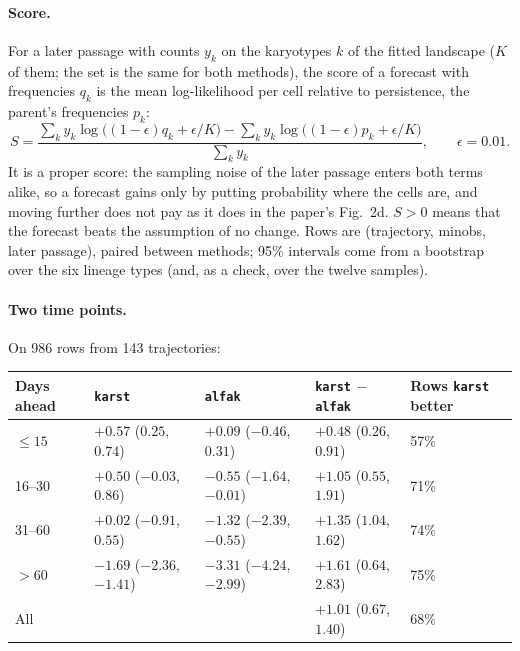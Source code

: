 \documentclass[11pt]{article}
\begin{document}
\paragraph{Score.} For a later passage with counts $y_k$ on the karyotypes $k$
of the fitted landscape ($K$ of them; the set is the same for both methods),
the score of a forecast with frequencies $q_k$ is the mean log-likelihood per
cell relative to persistence, the parent's frequencies $p_k$:
\begin{equation}
  S=\frac{\sum_k y_k\log\bigl((1-\epsilon)q_k+\epsilon/K\bigr)
         -\sum_k y_k\log\bigl((1-\epsilon)p_k+\epsilon/K\bigr)}{\sum_k y_k},
  \qquad \epsilon=0.01.
  \label{eq:horizon-score}
\end{equation}
It is a proper score: the sampling noise of the later passage enters both
terms alike, so a forecast gains only by putting probability where the cells
are, and moving further does not pay as it does in the paper's Fig.~2d.
$S>0$ means that the forecast beats the assumption of no change. Rows are
(trajectory, minobs, later passage), paired between methods; 95\% intervals
come from a bootstrap over the six lineage types (and, as a check, over the
twelve samples).

\paragraph{Two time points.} On 986 rows from 143 trajectories:

\begin{center}
\begin{tabular}{L{0.16\textwidth}L{0.17\textwidth}L{0.17\textwidth}L{0.2\textwidth}L{0.13\textwidth}}
\toprule
Days ahead & \texttt{karst} & \texttt{alfak} & \texttt{karst} $-$ \texttt{alfak} & Rows \texttt{karst} better \\
\midrule
$\le 15$ & $+0.57$ ($0.25$, $0.74$) & $+0.09$ ($-0.46$, $0.31$) & $+0.48$ ($0.26$, $0.91$) & 57\% \\
16--30 & $+0.50$ ($-0.03$, $0.86$) & $-0.55$ ($-1.64$, $-0.01$) & $+1.05$ ($0.55$, $1.91$) & 71\% \\
31--60 & $+0.02$ ($-0.91$, $0.55$) & $-1.32$ ($-2.39$, $-0.55$) & $+1.35$ ($1.04$, $1.62$) & 74\% \\
$> 60$ & $-1.69$ ($-2.36$, $-1.41$) & $-3.31$ ($-4.24$, $-2.99$) & $+1.61$ ($0.64$, $2.83$) & 75\% \\
All & & & $+1.01$ ($0.67$, $1.40$) & 68\% \\
\bottomrule
\end{tabular}
\end{center}
\end{document}

